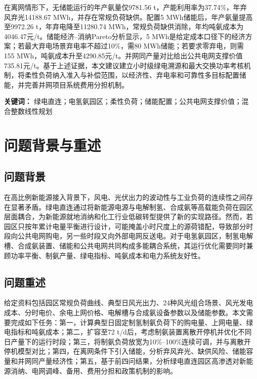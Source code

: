 \documentclass[UTF8,a4paper,12pt]{ctexart}
\begin{document}
在离网情形下，无储能运行的年产氨量仅9781.56 t，产能利用率为37.74\%，年弃风弃光14188.67 MWh，并存在常规负荷缺供。配置5 MWh储能后，年产氨量提高至9972.26 t，年弃电降至11280.74 MWh，常规负荷缺供消除，年均吨氨成本为4046.47元/t。储能经济--消纳Pareto分析显示，5 MWh是给定成本口径下的经济方案；若最大弃电场景弃电率不超过10\%，需80 MWh储能；若要求零弃电，则需155 MWh，吨氨成本升至4290.85元/t。并网同产量对比给出公共电网支撑价值735.81元/t。基于上述证据，本文建议建立小时级绿电溯源和最大交换功率考核机制，将柔性负荷纳入准入与补偿范围，以经济性、弃电率和可靠性多目标配置储能，并完善并网项目系统费用分担机制。

\vspace{0.6em}
\noindent\textbf{关键词：}
绿电直连；电氢氨园区；柔性负荷；储能配置；公共电网支撑价值；混合整数线性规划

\clearpage
\setcounter{page}{2}

\section{问题背景与重述}

\subsection{问题背景}

在高比例新能源接入背景下，风电、光伏出力的波动性与工业负荷的连续性之间存在显著矛盾。绿电直连通过将新能源电源与电解制氢、合成氨等高载能负荷在园区层面耦合，为新能源就地消纳和化工行业低碳转型提供了新的实现路径\cite{policy_green_direct_2026,policy_green_direct_2025}。然而，若园区只按年累计电量平衡进行设计，可能掩盖小时尺度上的源荷错配，导致部分时段向公共电网购电，另一些时段又向外部电网反送电。对于电氢氨园区，制氢电解槽、合成氨装置、储能和公共电网共同构成多能耦合系统，其运行优化需要同时兼顾功率平衡、制氨产量、绿电指标、吨氨成本和电力系统友好性。

\subsection{问题重述}

给定资料包括园区常规负荷曲线、典型日风光出力、24种风光组合场景、风光发电成本、分时电价、余电上网价格、电解槽与合成氨设备参数以及储能参数。本文需要完成如下任务：第一，计算典型日固定制氢制氨负荷下的购电量、上网电量、绿电指标和吨氨成本；第二，扩容至72 t/d后，考虑制氨装置离散开停机并优化不同日产量下的运行时段；第三，将制氨负荷放宽为10\%--100\%连续可调，并与离散开停机模型对比；第四，在离网条件下引入储能，分析弃风弃光、缺供风险、储能容量和并网同产量经济性；第五，基于前四问结果，分析绿电直连园区高渗透对新能源消纳、电网调峰、备用、费用分担和政策机制的影响。
\end{document}
